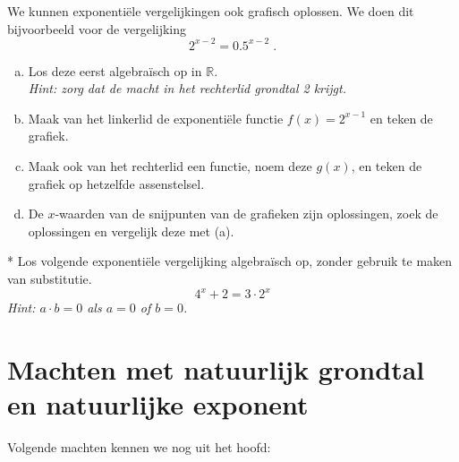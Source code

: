 \documentclass[12pt,twoside]{article}
\begin{document}
\begin{oefening}
We kunnen exponentiële vergelijkingen ook grafisch oplossen. We doen dit bijvoorbeeld voor de vergelijking
$$2^{x-2}=0.5^{x-2}\;.$$
\begin{enumerate}[(a)]
  \item Los deze eerst algebraïsch op in $\mathbb{R}$.\\
        {\em Hint: zorg dat de macht in het rechterlid grondtal 2 krijgt.}
  \item Maak van het linkerlid de exponentiële functie $f(x)=2^{x-1}$ en teken de grafiek.
  \item Maak ook van het rechterlid een functie, noem deze $g(x)$, en teken de grafiek op hetzelfde assenstelsel.
  \item De $x$-waarden van de snijpunten van de grafieken zijn oplossingen, zoek de oplossingen en vergelijk deze met (a).
\end{enumerate}
\end{oefening}

\begin{oefening}*
Los volgende exponentiële vergelijking algebraïsch op, zonder gebruik te maken van substitutie.
$$4^x+2=3\cdot2^x$$
{\em Hint: $a\cdot b=0$ als $a=0$ of $b=0$.}
\end{oefening}

\pagebreak
\appendix
\section{Machten met natuurlijk grondtal en natuurlijke exponent}

Volgende machten kennen we nog uit het hoofd:
\end{document}
